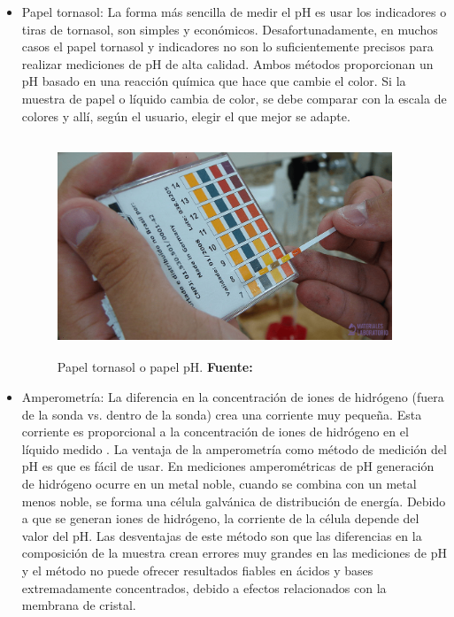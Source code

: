 \begin{itemize}
    \item Papel tornasol: La forma más sencilla de medir el pH es usar los indicadores o tiras de tornasol, son simples y económicos. 
    Desafortunadamente, en muchos casos el papel tornasol y indicadores no son lo suficientemente precisos para realizar mediciones de pH de alta calidad. 
    Ambos métodos proporcionan un pH basado en una reacción química que hace que cambie el color. 
    Si la muestra de papel o líquido cambia de color, se debe comparar con la escala de colores y allí, según el usuario, elegir el que mejor se adapte.
    
    \begin{figure}[H]
        \centering
        \includegraphics[width=100mm, height=65mm]{Imagenes/cap2/Papel-tornasol-min.png}
        \caption {Papel tornasol o papel pH. \textbf{Fuente:} \cite{noauthor_papel-tornasol-min-768x432png_nodate} }
        \label{fig:tornasol}
    \end{figure}
    
    \item Amperometría: La diferencia en la concentración de iones de hidrógeno (fuera de la sonda vs. dentro de la sonda) crea una corriente muy pequeña. 
    Esta corriente es proporcional a la concentraci\'on de iones de hidrógeno en el líquido medido \cite{Atlas_pH}. 
    La ventaja de la amperometría como método de medición del pH es que es fácil de usar. 
    En mediciones amperométricas de pH generación de hidrógeno ocurre en un metal noble, cuando se combina con un metal menos noble, se forma una c\'elula galvánica de distribución de energía. 
    Debido a que se generan iones de hidrógeno, la corriente de la c\'elula depende del valor del pH. 
    Las desventajas de este método son que las diferencias en la composición de la muestra crean errores muy grandes en las mediciones de pH y el método no puede ofrecer resultados fiables en ácidos y bases extremadamente concentrados, debido a efectos relacionados con la membrana de cristal. 
    

\end{itemize}
